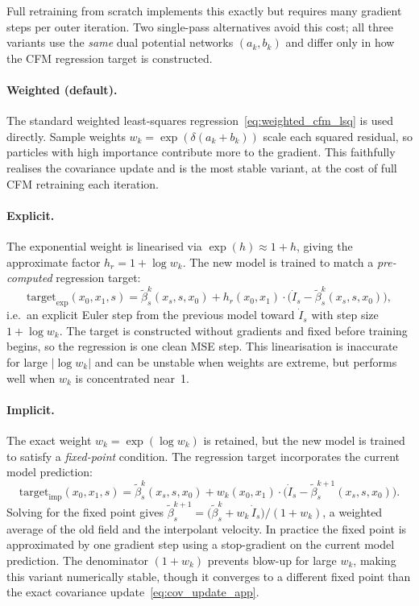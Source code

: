 \documentclass[11pt]{article}
\theoremstyle{definition}
\numberwithin{equation}{section}%
\begin{document}
Full retraining from scratch implements this exactly but requires many gradient
steps per outer iteration.  Two single-pass alternatives avoid this cost; all
three variants use the \emph{same} dual potential networks $(a_k, b_k)$ and
differ only in how the CFM regression target is constructed.

\paragraph{Weighted (default).}
The standard weighted least-squares regression~\eqref{eq:weighted_cfm_lsq} is
used directly.  Sample weights $w_k = \exp(\delta(a_k+b_k))$ scale each
squared residual, so particles with high importance contribute more to the
gradient.  This faithfully realises the covariance update and is the most
stable variant, at the cost of full CFM retraining each iteration.

\paragraph{Explicit.}
The exponential weight is linearised via $\exp(h)\approx 1+h$, giving the
approximate factor $h_r = 1 + \log w_k$.
The new model is trained to match a \emph{pre-computed} regression target:
\[
\mathrm{target}_\mathrm{exp}(x_0,x_1,s)
= \tilde\beta^k_s(x_s,s,x_0)
  + h_r(x_0,x_1)\cdot
    \bigl(\dot I_s - \tilde\beta^k_s(x_s,s,x_0)\bigr),
\]
i.e.\ an explicit Euler step from the previous model toward $\dot I_s$
with step size $1+\log w_k$.  The target is constructed without gradients
and fixed before training begins, so the regression is one clean MSE step.
This linearisation is inaccurate for large $|\log w_k|$ and can be unstable
when weights are extreme, but performs well when $w_k$ is concentrated near~1.

\paragraph{Implicit.}
The exact weight $w_k = \exp(\log w_k)$ is retained, but the new model is
trained to satisfy a \emph{fixed-point} condition.  The regression target
incorporates the current model prediction:
\[
\mathrm{target}_\mathrm{imp}(x_0,x_1,s)
= \tilde\beta^k_s(x_s,s,x_0)
  + w_k(x_0,x_1)\cdot
    \bigl(\dot I_s - \tilde\beta^{k+1}_s(x_s,s,x_0)\bigr).
\]
Solving for the fixed point gives
$\tilde\beta^{k+1}_s = \bigl(\tilde\beta^k_s + w_k\,\dot I_s\bigr)/(1+w_k)$,
a weighted average of the old field and the interpolant velocity.
In practice the fixed point is approximated by one gradient step using a
stop-gradient on the current model prediction.
The denominator $(1+w_k)$ prevents blow-up for large $w_k$, making this
variant numerically stable, though it converges to a different fixed point
than the exact covariance update~\eqref{eq:cov_update_app}.
\end{document}
